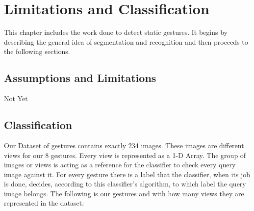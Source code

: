 \documentclass[12pt,fleqn]{book} %
\begin{document}
\begin{figure}[h]
\end{figure}

\section{Limitations and Classification}
This chapter includes the work done to detect static gestures. It begins by describing the general idea of segmentation and recognition and then proceeds to the following sections.\bigskip

\subsection{Assumptions and Limitations}
Not Yet \bigskip

\subsection{Classification} 
Our Dataset of gestures contains exactly 234 images. These images are different views for our 8 gestures. Every view is represented as a 1-D Array. The group of images or views is acting as a reference for the classifier to check every query image against it. For every gesture there is a label that the classifier, when its job is done, decides, according to this classifier’s algorithm, to which label the query image belongs. The following is our gestures and with how many views they are represented in the dataset:
\end{document}
